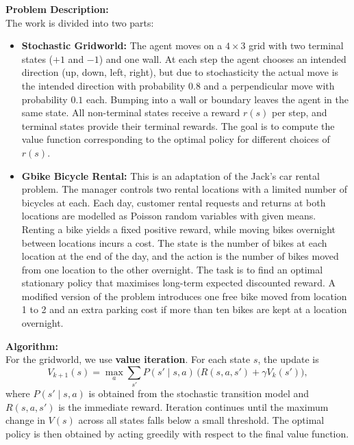 \documentclass[14pt]{extreport}
\begin{document}
\noindent\textbf{Problem Description:}\\
The work is divided into two parts:
\begin{itemize}
  \item \textbf{Stochastic Gridworld:} The agent moves on a $4 \times 3$
  grid with two terminal states ($+1$ and $-1$) and one wall. At each step
  the agent chooses an intended direction (up, down, left, right), but due
  to stochasticity the actual move is the intended direction with probability
  $0.8$ and a perpendicular move with probability $0.1$ each. Bumping into a
  wall or boundary leaves the agent in the same state. All non-terminal states
  receive a reward $r(s)$ per step, and terminal states provide their terminal
  rewards. The goal is to compute the value function corresponding to the
  optimal policy for different choices of $r(s)$.
  \item \textbf{Gbike Bicycle Rental:} This is an adaptation of the Jack's
  car rental problem. The manager controls two rental locations with a
  limited number of bicycles at each. Each day, customer rental requests and
  returns at both locations are modelled as Poisson random variables with
  given means. Renting a bike yields a fixed positive reward, while moving
  bikes overnight between locations incurs a cost. The state is the number
  of bikes at each location at the end of the day, and the action is the
  number of bikes moved from one location to the other overnight. The task
  is to find an optimal stationary policy that maximises long-term expected
  discounted reward. A modified version of the problem introduces one free
  bike moved from location 1 to 2 and an extra parking cost if more than
  ten bikes are kept at a location overnight.
\end{itemize}

\vspace{1em}

\noindent\textbf{Algorithm:}\\
For the gridworld, we use \textbf{value iteration}. For each state $s$, the
update is
\[
V_{k+1}(s) = \max_a \sum_{s'} P(s' \mid s,a)\,\bigl(R(s,a,s') + \gamma V_k(s')\bigr),
\]
where $P(s' \mid s,a)$ is obtained from the stochastic transition model and
$R(s,a,s')$ is the immediate reward. Iteration continues until the maximum
change in $V(s)$ across all states falls below a small threshold. The optimal
policy is then obtained by acting greedily with respect to the final value
function.
\end{document}
